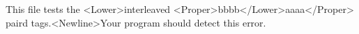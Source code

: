 This file tests
the <Lower>interleaved <Proper>bbbb</Lower>aaaa</Proper>
paird tags.<Newline>Your 
program 
should 
detect 
this 
error.
